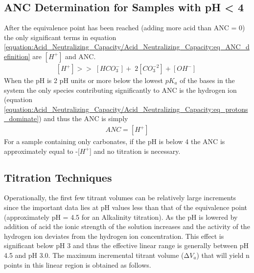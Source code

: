 \documentclass[letterpaper,10pt,english]{sphinxmanual}
\begin{document}
\subsection{ANC Determination for Samples with pH \textless{} 4}
\label{\detokenize{Acid_Neutralizing_Capacity/Acid_Neutralizing_Capacity:anc-determination-for-samples-with-ph-4}}
After the equivalence point has been reached (adding more acid than ANC = 0) the only significant terms in equation \eqref{equation:Acid_Neutralizing_Capacity/Acid_Neutralizing_Capacity:eq_ANC_definition} are \(\left[{H}^{+} \right]\) and ANC.
\begin{equation}\label{equation:Acid_Neutralizing_Capacity/Acid_Neutralizing_Capacity:eq_protons_dominate}
\begin{split}\left[{H}^{+} \right]>>{\; }\left[{HCO}_{{3}}^{{-}} \right]+{\; 2}\left[{CO}_{{3}}^{{-2}} \right]+\left[{OH}^{{-}} \right]{\; }\end{split}
\end{equation}
When the pH is 2 pH units or more below the lowest \(pK_a\) of the bases in the system the only species contributing significantly to ANC is the hydrogen ion (equation \eqref{equation:Acid_Neutralizing_Capacity/Acid_Neutralizing_Capacity:eq_protons_dominate}) and thus the ANC is simply
\begin{equation}\label{equation:Acid_Neutralizing_Capacity/Acid_Neutralizing_Capacity:eq_Gran_pH_lt4}
\begin{split}ANC=[H^+]\end{split}
\end{equation}
For a sample containing only carbonates, if the pH is below 4 the ANC is approximately equal to -{[}\(H^+\){]} and no titration is necessary.


\subsection{Titration Techniques}
\label{\detokenize{Acid_Neutralizing_Capacity/Acid_Neutralizing_Capacity:titration-techniques}}\label{\detokenize{Acid_Neutralizing_Capacity/Acid_Neutralizing_Capacity:heading-anc-titration-techniques}}
Operationally, the first few titrant volumes can be relatively large increments since the important data lies at pH values less than that of the equivalence point (approximately pH = 4.5 for an Alkalinity titration). As the pH is lowered by addition of acid the ionic strength of the solution increases and the activity of the hydrogen ion deviates from the hydrogen ion concentration. This effect is significant below pH 3 and thus the effective linear range is generally between pH 4.5 and pH 3.0. The maximum incremental titrant volume (\(\mathrm{\Delta}V_a\)) that will yield n points in this linear region is obtained as follows.
\end{document}
